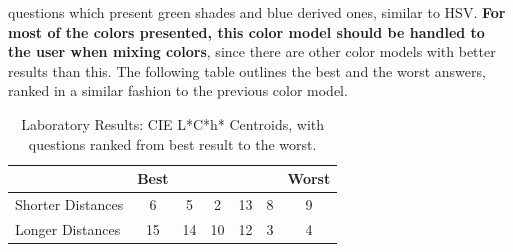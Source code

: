 questions which present green shades and blue derived ones, similar to HSV. \textbf{For most of the colors presented, this color model should be handled to the user when mixing colors}, since there are other color
models with better results than this.
%
The following table outlines the best and the worst answers, ranked in a similar fashion to the previous color model.
%
\begin{table}[htbp]
  \centering
  \begin{tabular}{@{}lcccccc@{}}
  \toprule
      & \multicolumn{1}{l}{Best}                        & \multicolumn{1}{l}{}                            & \multicolumn{1}{l}{}                           & \multicolumn{1}{l}{}                            & \multicolumn{1}{l}{}                            & \multicolumn{1}{l}{Worst}                       \\ \midrule
  \multicolumn{1}{l|}{Shorter Distances} & \multicolumn{1}{c||}{\cellcolor[HTML]{FF8000}6} & \multicolumn{1}{c||}{\cellcolor[HTML]{FF0080}5}  & \multicolumn{1}{c||}{\cellcolor[HTML]{FF00FF}2} & \multicolumn{1}{c||}{\cellcolor[HTML]{00FF80}13}  & \multicolumn{1}{c||}{\cellcolor[HTML]{FF0000}8} & \multicolumn{1}{c|}{\cellcolor[HTML]{00FF80}9} \\ \midrule
  \multicolumn{1}{l|}{Longer Distances}  & \multicolumn{1}{c||}{\cellcolor[HTML]{00FF80}15} & \multicolumn{1}{c||}{\cellcolor[HTML]{8000FF}14} & \multicolumn{1}{c||}{\cellcolor[HTML]{0080FF}10} & \multicolumn{1}{c||}{\cellcolor[HTML]{80FF00}12} & \multicolumn{1}{c||}{\cellcolor[HTML]{80FF00}3} & \multicolumn{1}{c|}{\cellcolor[HTML]{7F00FF}4}  \\ \bottomrule
  \end{tabular}
  \caption[Laboratory Results: CIE L*C*h* Centroids]{Laboratory Results: CIE L*C*h* Centroids, with questions ranked from best result to the worst.}
  \label{table:centroids_lchresults}
\end{table}
%
